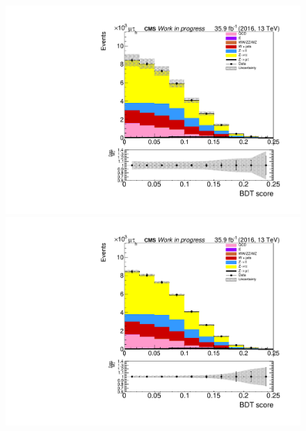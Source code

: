 \begin{figure}[htp]
	\begin{multicols}{2}
		\includegraphics[width=\linewidth]{plots/mt/ZeroJet_prefit.pdf}\par 
		\includegraphics[width=\linewidth]{plots/mt/ZeroJet_postfit.pdf}\par
	\end{multicols}	


\end{figure}
